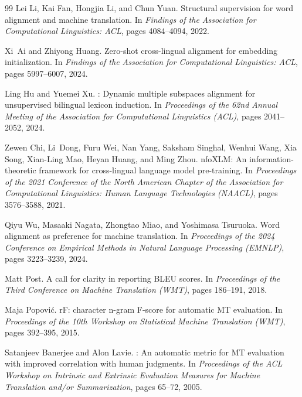 \documentclass[11pt,a4paper]{article}
\begin{document}
\begin{thebibliography}{99}
Lei Li, Kai Fan, Hongjia Li, and Chun Yuan.
\newblock Structural supervision for word alignment and machine translation.
\newblock In \emph{Findings of the Association for Computational Linguistics: ACL}, pages 4084--4094, 2022.

Xi~Ai and Zhiyong Huang.
\newblock Zero-shot cross-lingual alignment for embedding initialization.
\newblock In \emph{Findings of the Association for Computational Linguistics: ACL}, pages 5997--6007, 2024.

Ling Hu and Yuemei Xu.
: Dynamic multiple subspaces alignment for unsupervised bilingual lexicon induction.
\newblock In \emph{Proceedings of the 62nd Annual Meeting of the Association for Computational Linguistics (ACL)}, pages 2041--2052, 2024.

Zewen Chi, Li~Dong, Furu Wei, Nan Yang, Saksham Singhal, Wenhui Wang, Xia Song, Xian-Ling Mao, Heyan Huang, and Ming Zhou.
nfo{XLM}: An information-theoretic framework for cross-lingual language model pre-training.
\newblock In \emph{Proceedings of the 2021 Conference of the North American Chapter of the Association for Computational Linguistics: Human Language Technologies (NAACL)}, pages 3576--3588, 2021.

Qiyu Wu, Masaaki Nagata, Zhongtao Miao, and Yoshimasa Tsuruoka.
\newblock Word alignment as preference for machine translation.
\newblock In \emph{Proceedings of the 2024 Conference on Empirical Methods in Natural Language Processing (EMNLP)}, pages 3223--3239, 2024.

Matt Post.
\newblock A call for clarity in reporting {BLEU} scores.
\newblock In \emph{Proceedings of the Third Conference on Machine Translation (WMT)}, pages 186--191, 2018.

Maja Popovi{\'c}.
r{F}: character n-gram {F}-score for automatic {MT} evaluation.
\newblock In \emph{Proceedings of the 10th Workshop on Statistical Machine Translation (WMT)}, pages 392--395, 2015.

Satanjeev Banerjee and Alon Lavie.
: An automatic metric for {MT} evaluation with improved correlation with human judgments.
\newblock In \emph{Proceedings of the ACL Workshop on Intrinsic and Extrinsic Evaluation Measures for Machine Translation and/or Summarization}, pages 65--72, 2005.


\end{thebibliography}
\end{document}
